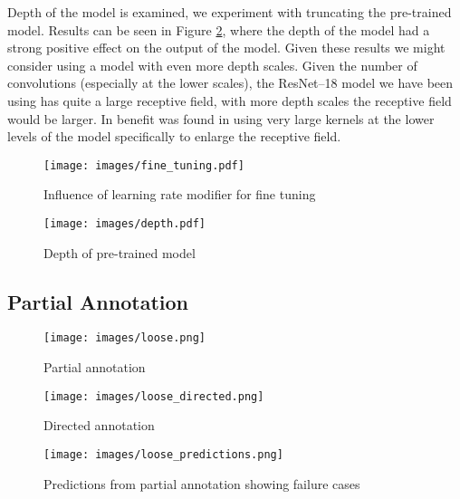 \documentclass{IEEEtran}
\begin{document}
Depth of the model is examined, we experiment with truncating the pre-trained model. Results can be seen in Figure \ref{fig:depth}, where the depth of the model had a strong positive effect on the output of the model. Given these results we might consider using a model with even more depth scales. Given the number of convolutions (especially at the lower scales), the ResNet--18 model we have been using has quite a large receptive field, with more depth scales the receptive field would be larger. In \cite{Peng2017} benefit was found in using very large kernels at the lower levels of the model specifically to enlarge the receptive field.

\begin{figure*}[!ht]
\centering
\begin{subfigure}{.5\textwidth}
  \centering
  \texttt{[image: images/fine\_tuning.pdf]}
  \caption{Influence of learning rate modifier for fine tuning}  
  \label{fig:fine}
\end{subfigure}%
\begin{subfigure}{.5\textwidth}
  \centering
  \texttt{[image: images/depth.pdf]}
  \caption{Depth of pre-trained model}  
  \label{fig:depth}
\end{subfigure}

\label{fig:training}
\end{figure*}




\subsection {Partial Annotation}


\begin{figure*}[!ht]
\centering
\begin{subfigure}[t]{.3\textwidth}
  \centering
  \texttt{[image: images/loose.png]}
  \caption{Partial annotation}
  \label{fig:loose_annot}
\end{subfigure}%
\begin{subfigure}[t]{.3\textwidth}
  \centering
  \texttt{[image: images/loose\_directed.png]}
  \caption{Directed annotation}
  \label{fig:loose_dir}

\end{subfigure}%
\begin{subfigure}[t]{.3\textwidth}
  \centering
  \texttt{[image: images/loose\_predictions.png]}
  \caption{Predictions from partial annotation showing failure cases}
  \label{fig:loose_pred}
\end{subfigure}
  \caption{Loose annotation methods, red overlay refers to pixels labelled as background where transparent pixels are unlabelled}


\end{figure*}
\end{document}
